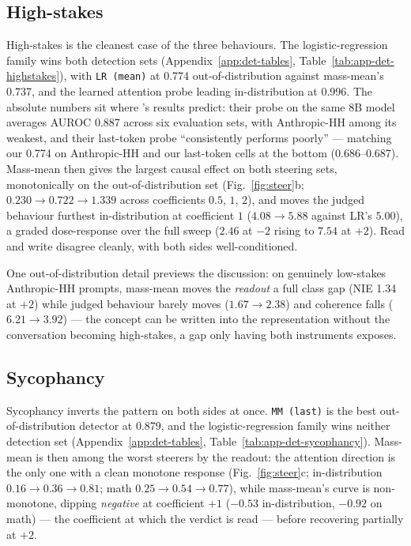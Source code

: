 \documentclass[conference]{IEEEtran}
\begin{document}
\subsection{High-stakes}
High-stakes is the cleanest case of the three behaviours. The
logistic-regression family wins both detection
sets (Appendix~\ref{app:det-tables}, Table~\ref{tab:app-det-highstakes}), with
\texttt{LR (mean)} at 0.774
out-of-distribution against mass-mean's
0.737, and the learned attention probe leading in-distribution at 0.996.
The absolute numbers sit where \citeauthor{mckenzie2025}'s results predict:
their probe on the same 8B model averages AUROC 0.887 across six evaluation
sets, with Anthropic-HH among its weakest, and their last-token probe
``consistently performs poorly'' --- matching our 0.774 on Anthropic-HH and our
last-token cells at the bottom (0.686--0.687).
Mass-mean then gives the largest causal effect on both steering sets,
monotonically on the out-of-distribution set (Fig.~\ref{fig:steer}b;
$0.230 \to 0.722 \to 1.339$ across
coefficients $0.5$, $1$, $2$), and moves the judged behaviour furthest
in-distribution at coefficient $1$ ($4.08 \to 5.88$ against LR's $5.00$), a
graded dose-response over the full sweep ($2.46$ at $-2$ rising to $7.54$ at
$+2$). Read and write disagree cleanly, with both sides well-conditioned.

One out-of-distribution detail previews the discussion: on genuinely low-stakes
Anthropic-HH prompts, mass-mean moves the \emph{readout} a full class gap
(NIE 1.34 at $+2$) while judged behaviour barely moves ($1.67 \to 2.38$) and
coherence falls ($6.21 \to 3.92$) --- the concept can be written into the
representation without the conversation becoming high-stakes, a gap only having
both instruments exposes.

\subsection{Sycophancy}
Sycophancy inverts the pattern on both sides at once. \texttt{MM (last)} is the
best out-of-distribution detector at 0.879, and the logistic-regression family
wins neither detection set (Appendix~\ref{app:det-tables},
Table~\ref{tab:app-det-sycophancy}). Mass-mean is
then among the worst steerers by the
readout: the attention direction is the only one with a clean monotone response
(Fig.~\ref{fig:steer}c; in-distribution $0.16 \to 0.36 \to 0.81$; math
$0.25 \to 0.54 \to 0.77$), while
mass-mean's curve is non-monotone, dipping \emph{negative} at coefficient $+1$
($-0.53$ in-distribution, $-0.92$ on math) --- the coefficient at which the verdict
is read --- before recovering partially at $+2$.
\end{document}

